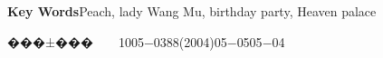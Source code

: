 \documentclass[a4paper,UTF8]{ctexart} %
\begin{document}
\begin{CJK*}{GBK}{song}
\begin{center}
{{{\textbf{Key Words}\quad Peach, lady Wang Mu, birthday party, Heaven palace}}
}
\end{center}
\begin{minipage}[c]{10cm}
\vspace{-35.5cm}
���±���~~~~1005$-$0388(2004)05$-$0505$-$04
\end{minipage}
\setlength{\oddsidemargin}{-.5cm}  %
\setlength{\evensidemargin}{\oddsidemargin}
\setlength{\textwidth}{17.00cm}
\begin{multicols}{2}

\end{multicols}
\end{CJK*}
\end{document}
